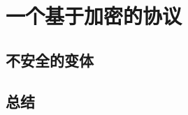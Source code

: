 \section{一个基于加密的协议}\label{sec:21-2}

\subsection{不安全的变体}\label{subsec:21-2-1}

\subsection{总结}\label{subsec:21-2-2}